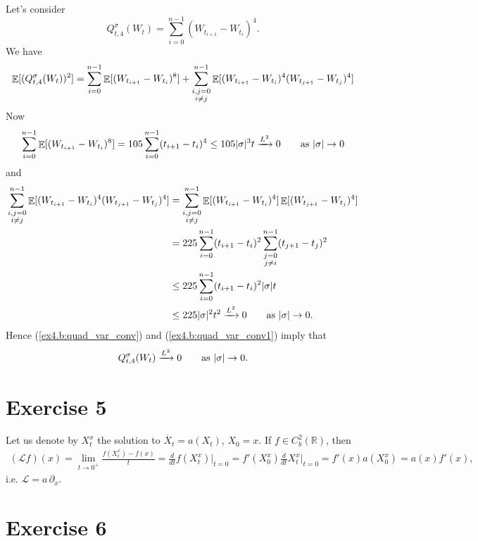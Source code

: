\documentclass[a4paper,11pt]{article}
\theoremstyle{definition}
\theoremstyle{plain}
\theoremstyle{remark}
\DeclarePairedDelimiter{\abs}{\lvert}{\rvert}
\DeclarePairedDelimiter{\parq}{[}{]}
\DeclareMathOperator*{\expval}{\mathbb{E}}
\begin{document}
Let's consider
$$
Q_{t,4}^\sigma(W_t) = \sum_{i=0}^{n-1}(W_{t_{i+1}}-W_{t_i})^4.
$$
We have
$$
\expval\parq{(Q_{t,4}^\sigma(W_t))^2} = \sum_{i=0}^{n-1}\expval\parq{(W_{t_{i+1}}-W_{t_i})^8} + \sum_{\substack{i,j=0 \\ i\neq j}}^{n-1}\expval\parq{(W_{t_{i+1}}-W_{t_i})^4(W_{t_{j+1}}-W_{t_j})^4}
$$
Now
\begin{equation}\label{ex4.b:quad_var_conv}
\sum_{i=0}^{n-1}\expval\parq{(W_{t_{i+1}}-W_{t_i})^8} = 105\sum_{i=0}^{n-1}(t_{i+1}-t_i)^4 \leq 105\abs\sigma^3t \xrightarrow{L^2} 0 \qquad \text{as } \abs{\sigma}\to0
\end{equation}
and 
\begin{align}
\sum_{\substack{i,j=0 \\ i\neq j}}^{n-1}\expval\parq{(W_{t_{i+1}}-W_{t_i})^4(W_{t_{j+1}}-W_{t_j})^4} & = \sum_{\substack{i,j=0 \\ i\neq j}}^{n-1}\expval\parq{(W_{t_{i+1}}-W_{t_i})^4}\expval\parq{(W_{t_{j+1}}-W_{t_j})^4} \notag \\ & = 225\sum_{i=0}^{n-1}(t_{i+1}-t_i)^2\sum_{\substack{j=0 \\ j\neq i}}^{n-1}(t_{j+1}-t_j)^2  \notag \\ & \leq 225\sum_{i=0}^{n-1}(t_{i+1}-t_i)^2\abs\sigma t \notag \\ & \leq 225\abs\sigma^2t^2 \xrightarrow{L^2} 0 \qquad \text{as } \abs{\sigma}\to0.\label{ex4.b:quad_var_conv1}
\end{align}
Hence (\ref{ex4.b:quad_var_conv}) and (\ref{ex4.b:quad_var_conv1}) imply that 
$$
Q_{t,4}^\sigma(W_t) \xrightarrow{L^2} 0 \qquad \text{as } \abs{\sigma}\to0.
$$

\section*{Exercise 5}

Let us denote by $X_t^x$ the solution to $\dot{X_t}=a(X_t)$, $X_0=x$. If $f\in C^2_b(\mathbb{R})$, then
\begin{align*}
(\mathcal{L}f)(x) = \lim_{t\to 0^+}\frac{f(X_t^x) - f(x)}{t} = \frac{d}{dt}f(X_t^x)\Big|_{t=0} = f'(X_0^x)\frac{d}{dt}X_t^x\Big|_{t=0} = f'(x)a(X^x_0) = a(x)f'(x),
\end{align*}
i.e. $\mathcal{L} = a\,\partial_x$.

\section*{Exercise 6}
\end{document}
